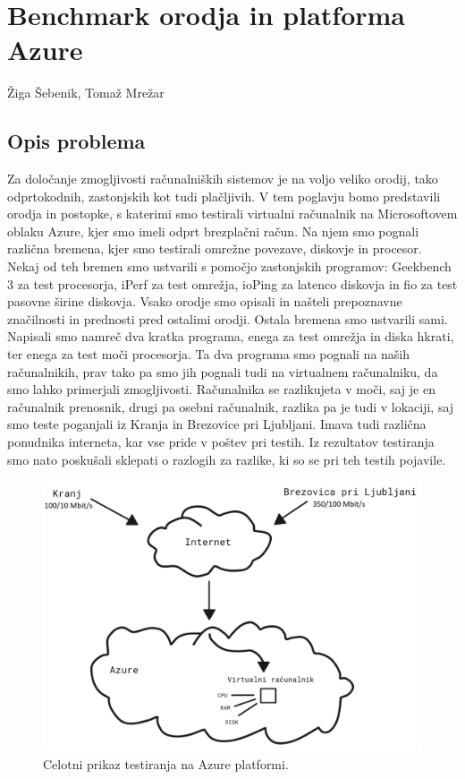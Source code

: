 \chapter{Benchmark orodja in platforma Azure}

\pagestyle{fancy}
\fancyhf{}
\fancyhead[LE,RO]{\thepage}
\fancyhead[RE,LO]{\leftmark}

\huge Žiga Šebenik, Tomaž Mrežar


\normalsize
\bigskip

\section{Opis problema}
Za določanje zmogljivosti računalniških sistemov je na voljo veliko orodij, tako odprtokodnih, zastonjskih kot tudi plačljivih. V tem poglavju bomo predstavili orodja in postopke, s katerimi smo testirali virtualni računalnik na Microsoftovem oblaku Azure, kjer smo imeli odprt brezplačni račun. Na njem smo pognali različna bremena, kjer smo testirali omrežne povezave, diskovje in procesor. Nekaj od teh bremen smo ustvarili s pomočjo zastonjskih programov: Geekbench 3 za test procesorja, iPerf za test omrežja, ioPing za latenco diskovja in fio za test pasovne širine diskovja. Vsako orodje smo opisali in našteli prepoznavne značilnosti in prednosti pred ostalimi orodji. Ostala bremena smo ustvarili sami. Napisali smo namreč dva kratka programa, enega za test omrežja in diska hkrati, ter enega za test moči procesorja. Ta dva programa smo pognali na naših računalnikih, prav tako pa smo jih pognali tudi na virtualnem računalniku, da smo lahko primerjali zmogljivosti. Računalnika se razlikujeta v moči, saj je en računalnik prenosnik, drugi pa osebni računalnik, razlika pa je tudi v lokaciji, saj smo teste poganjali iz Kranja in Brezovice pri Ljubljani. Imava tudi različna ponudnika interneta, kar vse pride v poštev pri testih. Iz rezultatov testiranja smo nato poskušali sklepati o razlogih za razlike, ki so se pri teh testih pojavile.
  
\begin{figure}[H]
	\centering
	\includegraphics[scale=0.15]{Img/3_celotni_diagram.png}
	\caption{Celotni prikaz testiranja na Azure platformi.}
	\label{fig:3_7_breme2}
\end{figure}


